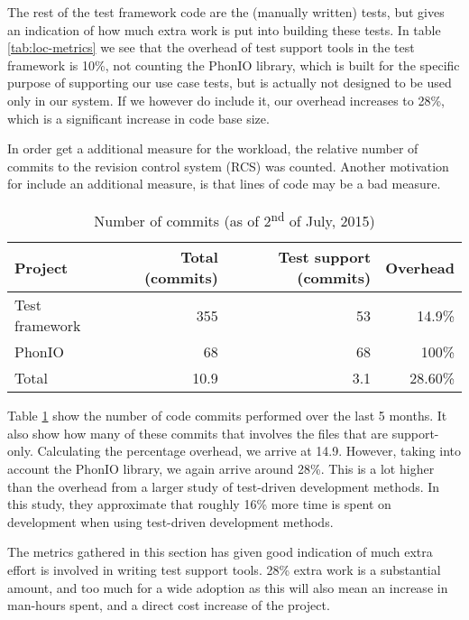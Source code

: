 \noindent The rest of the test framework code are the (manually written) tests, but gives an indication of how much extra work is put into building these tests. In table \ref{tab:loc-metrics} we see that the overhead of test support tools in the test framework is 10\%, not counting the PhonIO library, which is built for the specific purpose of supporting our use case tests, but is actually not designed to be used only in our system. If we however do include it, our overhead increases to 28\%, which is a significant increase in code base size.\medskip

\noindent In order get a additional measure for the workload, the relative number of commits to the revision control system (RCS) was counted. Another motivation for include an additional measure, is that lines of code may be a bad measure\cite{fraser2013does}.\medskip

\begin{table}[!htbp]
\centering
\begin{tabular}{ | l | r | r | r |}
   \hline
   Project        & Total (commits) & Test support (commits) & Overhead \\ \hline
   Test framework & 355             & 53                     & 14.9\%   \\
   PhonIO         & 68              & 68                     & 100\%    \\
   \hline
   Total          & 10.9            & 3.1                    & 28.60\%  \\
   \hline
   
\end{tabular}
\caption{Number of commits (as of 2\textsuperscript{nd} of July, 2015)}
\label{tab:metrics-commit-count}
\end{table}

\noindent Table \ref{tab:metrics-commit-count} show the number of code commits performed over the last 5 months. It also show how many of these commits that involves the files that are support-only. Calculating the percentage overhead, we arrive at 14.9. However, taking into account the PhonIO library, we again arrive around 28\%. This is a lot higher than the overhead from a larger study of test-driven development methods\cite{george2003}. In this study, they approximate that roughly 16\% more time is spent on development when using test-driven development methods.\medskip

\noindent The metrics gathered in this section has given good indication of much extra effort is involved in writing test support tools. 28\% extra work is a substantial amount, and too much for a wide adoption as this will also mean an increase in man-hours spent, and a direct cost increase of the project. 

